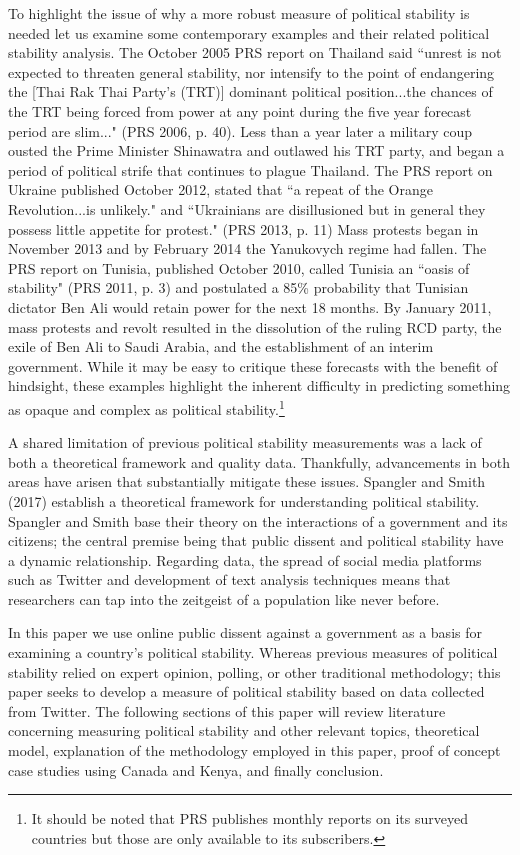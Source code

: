 \documentclass[12pt]{article}
\begin{document}
\begin{spacing}{1.5}
To highlight the issue of why a more robust measure of political stability is needed let us examine some contemporary examples and their related political stability analysis. The October 2005 PRS report on Thailand said ``unrest is not expected to threaten general stability, nor intensify to the point of endangering the [Thai Rak Thai Party's (TRT)] dominant political position...the chances of the TRT being forced from power at any point during the five year forecast period are slim..." (PRS 2006, p. 40). Less than a year later a military coup ousted the Prime Minister Shinawatra and outlawed his TRT party, and began a period of political strife that continues to plague Thailand. The PRS report on Ukraine published October 2012, stated that ``a repeat of the Orange Revolution...is unlikely." and ``Ukrainians are disillusioned but in general they possess little appetite for protest." (PRS 2013, p. 11) Mass protests began in November 2013 and by February 2014 the Yanukovych regime had fallen. The PRS report on Tunisia, published October 2010, called Tunisia an ``oasis of stability" (PRS 2011, p. 3) and postulated a 85\% probability that Tunisian dictator Ben Ali would retain power for the next 18 months. By January 2011, mass protests and revolt resulted in the dissolution of the ruling RCD party, the exile of Ben Ali to Saudi Arabia, and the establishment of an interim government. While it may be easy to critique these forecasts with the benefit of hindsight, these examples highlight the inherent difficulty in predicting something as opaque and complex as political stability.\footnote{It should be noted that PRS publishes monthly reports on its surveyed countries but those are only available to its subscribers.} 

A shared limitation of previous political stability measurements was a lack of both a theoretical framework and quality data. Thankfully, advancements in both areas have arisen that substantially mitigate these issues. Spangler and Smith (2017) establish a theoretical framework for understanding political stability. Spangler and Smith base their theory on the interactions of a government and its citizens; the central premise being that public dissent and political stability have a dynamic relationship. Regarding data, the spread of social media platforms such as Twitter and development of text analysis techniques means that researchers can tap into the zeitgeist of a population like never before. 

In this paper we use online public dissent against a government as a basis for examining a country's political stability. Whereas previous measures of political stability relied on expert opinion, polling, or other traditional methodology; this paper seeks to develop a measure of political stability based on data collected from Twitter. The following sections of this paper will review literature concerning measuring political stability and other relevant topics, theoretical model, explanation of the methodology employed in this paper, proof of concept case studies using Canada and Kenya, and finally conclusion. 


\end{spacing}
\end{document}
